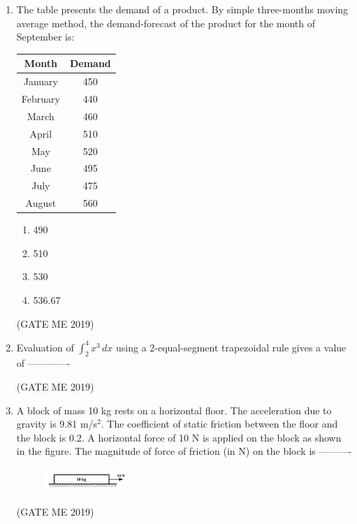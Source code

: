 \documentclass[journal]{IEEEtran}
\begin{document}
\begin{enumerate}
\item The table presents the demand of a product. By simple three-months moving average method, the demand-forecast of the product for the month of September is:

\begin{center}
\begin{tabular}{|c|c|}
\hline
\textbf{Month} & \textbf{Demand} \\
\hline
January & 450 \\
\hline
February & 440 \\
\hline
March & 460 \\
\hline
April & 510 \\
\hline
May & 520 \\
\hline
June & 495 \\
\hline
July & 475 \\
\hline
August & 560 \\
\hline
\end{tabular}
\end{center}

\begin{multicols}{4}
\begin{enumerate}
\item 490
\item 510  
\item 530
\item 536.67  
\end{enumerate}
\end{multicols}

\hfill (GATE ME 2019)

\item Evaluation of $\int_{2}^{4} x^3 \, dx$ using a 2-equal-segment trapezoidal rule gives a value of -------------

\hfill (GATE ME 2019)

\item A block of mass 10 kg rests on a horizontal floor. The acceleration due to gravity is 9.81 m/s$^2$. The coefficient of static friction between the floor and the block is 0.2. A horizontal force of 10 N is applied on the block as shown in the figure. The magnitude of force of friction (in N) on the block is ----------

\begin{figure}[H]
\centering
\includegraphics[width=0.3\textwidth]{Fig 6.png}
\caption{}
\label{fig:quetion19}
\end{figure}
\hfill (GATE ME 2019)


\end{enumerate}
\end{document}
